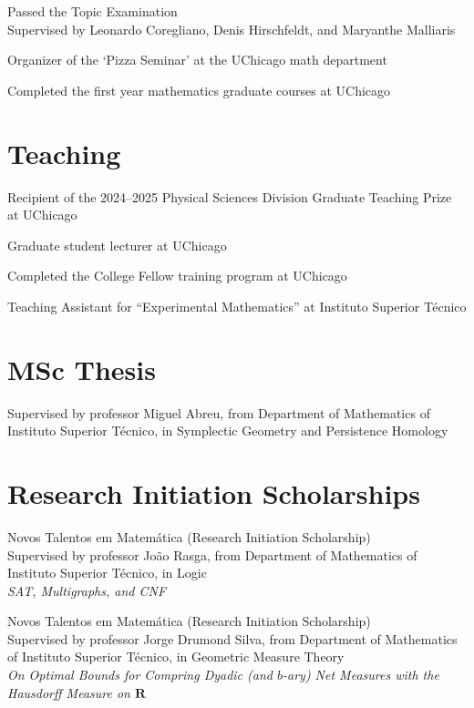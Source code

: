 \documentclass[11pt]{article} %
\begin{document}
 \entry Passed the Topic Examination\\
Supervised by Leonardo Coregliano, Denis Hirschfeldt, and Maryanthe Malliaris

 \entry Organizer of the `Pizza Seminar' at the UChicago math department

 \entry Completed the first year mathematics graduate courses at UChicago

\section*{Teaching}

 \entry Recipient of the 2024–2025 Physical Sciences Division Graduate Teaching Prize at UChicago

 \entry Graduate student lecturer at UChicago

 \entry Completed the College Fellow training program at UChicago

 \entry Teaching Assistant for ``Experimental Mathematics'' at Instituto Superior Técnico

\section*{MSc Thesis}

Supervised by professor Miguel Abreu, from Department of Mathematics of Instituto Superior Técnico, in Symplectic Geometry and Persistence Homology

\section*{Research Initiation Scholarships}

 Novos Talentos em Matemática (Research Initiation Scholarship)\\
Supervised by professor João Rasga, from Department of Mathematics of Instituto Superior Técnico, in Logic\\
\textit{SAT, Multigraphs, and CNF}

\medskip

 Novos Talentos em Matemática (Research Initiation Scholarship)\\
Supervised by professor Jorge Drumond Silva, from Department of Mathematics of Instituto Superior Técnico, in Geometric Measure Theory\\
\textit{On Optimal Bounds for Compring Dyadic (and $b$-ary) Net Measures with the Hausdorff Measure on $\mathbf{R}$}
\medskip
\end{document}
